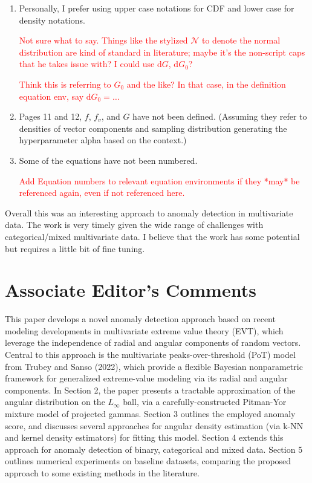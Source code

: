 \documentclass{article}
\newcommand{\makenote}[1]{\textcolor{red}{#1}}
\begin{document}
\begin{description}
\begin{enumerate}
        \item Personally, I prefer using upper case notations for CDF and lower case for density
            notations.

            \makenote{Not sure what to say.  Things like the stylized $\mathcal{N}$ to denote the
                normal distribution are kind of standard in literature; maybe it's the non-script
                caps that he takes issue with?  I could use $\text{d}G$, $\text{d}G_0$?}

            \makenote{Think this is referring to $G_0$ and the like?  In that case, in the definition
                equation env, say $\text{d}G_0 = \ldots$}

        \item Pages 11 and 12, $f$, $f_v$, and $G$ have not been defined. (Assuming they refer to 
            densities of vector components and sampling distribution generating the hyperparameter 
            alpha based on the context.)

        \item Some of the equations have not been numbered.

            \makenote{Add Equation numbers to relevant equation environments if they *may* be referenced
                again,  even if not referenced here.}
    \end{enumerate}
\end{description}

Overall this was an interesting approach to anomaly detection in multivariate data. The work is very 
    timely given the wide range of challenges with categorical/mixed multivariate data. I believe 
    that the work has some potential but requires a little bit of fine tuning.

\section{Associate Editor's Comments}
This paper develops a novel anomaly detection approach based on recent modeling developments in 
    multivariate extreme value theory (EVT), which leverage the independence of radial and angular 
    components of random vectors. Central to this approach is the multivariate peaks-over-threshold 
    (PoT) model from Trubey and Sanso (2022), which provide a flexible Bayesian nonparametric 
    framework for generalized extreme-value modeling via its radial and angular components. In 
    Section 2, the paper presents a tractable approximation of the angular distribution on the 
    $L_\infty$ ball, via a carefully-constructed Pitman-Yor mixture model of projected gammas. 
    Section 3 outlines the employed anomaly score, and discusses several approaches for angular 
    density estimation (via k-NN and kernel density estimators) for fitting this model. Section 4 
    extends this approach for anomaly detection of binary, categorical and mixed data. Section 5 
    outlines numerical experiments on baseline datasets, comparing the proposed approach to some 
    existing methods in the literature.
\end{document}

